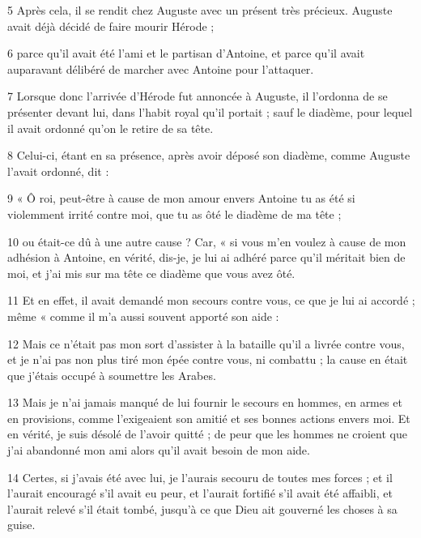 \par 5 Après cela, il se rendit chez Auguste avec un présent très précieux. Auguste avait déjà décidé de faire mourir Hérode ;

\par 6 parce qu'il avait été l'ami et le partisan d'Antoine, et parce qu'il avait auparavant délibéré de marcher avec Antoine pour l'attaquer.

\par 7 Lorsque donc l'arrivée d'Hérode fut annoncée à Auguste, il l'ordonna de se présenter devant lui, dans l'habit royal qu'il portait ; sauf le diadème, pour lequel il avait ordonné qu'on le retire de sa tête.

\par 8 Celui-ci, étant en sa présence, après avoir déposé son diadème, comme Auguste l'avait ordonné, dit :

\par 9 « Ô roi, peut-être à cause de mon amour envers Antoine tu as été si violemment irrité contre moi, que tu as ôté le diadème de ma tête ;

\par 10 ou était-ce dû à une autre cause ? Car, « si vous m'en voulez à cause de mon adhésion à Antoine, en vérité, dis-je, je lui ai adhéré parce qu'il méritait bien de moi, et j'ai mis sur ma tête ce diadème que vous avez ôté.

\par 11 Et en effet, il avait demandé mon secours contre vous, ce que je lui ai accordé ; même « comme il m'a aussi souvent apporté son aide :

\par 12 Mais ce n'était pas mon sort d'assister à la bataille qu'il a livrée contre vous, et je n'ai pas non plus tiré mon épée contre vous, ni combattu ; la cause en était que j'étais occupé à soumettre les Arabes.

\par 13 Mais je n'ai jamais manqué de lui fournir le secours en hommes, en armes et en provisions, comme l'exigeaient son amitié et ses bonnes actions envers moi. Et en vérité, je suis désolé de l'avoir quitté ; de peur que les hommes ne croient que j’ai abandonné mon ami alors qu’il avait besoin de mon aide.

\par 14 Certes, si j'avais été avec lui, je l'aurais secouru de toutes mes forces ; et il l'aurait encouragé s'il avait eu peur, et l'aurait fortifié s'il avait été affaibli, et l'aurait relevé s'il était tombé, jusqu'à ce que Dieu ait gouverné les choses à sa guise.

